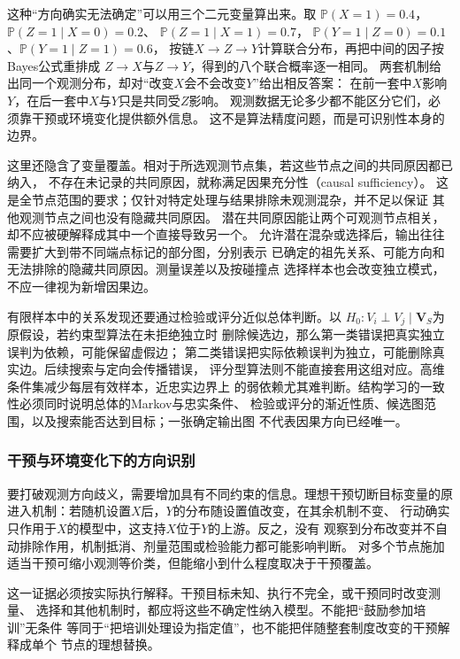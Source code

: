 这种“方向确实无法确定”可以用三个二元变量算出来。取
\(\mathbb P(X=1)=0.4\)，\(\mathbb P(Z=1\mid X=0)=0.2\)、
\(\mathbb P(Z=1\mid X=1)=0.7\)，
\(\mathbb P(Y=1\mid Z=0)=0.1\)、\(\mathbb P(Y=1\mid Z=1)=0.6\)，
按链\(X\to Z\to Y\)计算联合分布，再把中间的因子按Bayes公式重排成
\(Z\to X\)与\(Z\to Y\)，得到的八个联合概率逐一相同。
两套机制给出同一个观测分布，却对“改变\(X\)会不会改变\(Y\)”给出相反答案：
在前一套中\(X\)影响\(Y\)，在后一套中\(X\)与\(Y\)只是共同受\(Z\)影响。
观测数据无论多少都不能区分它们，必须靠干预或环境变化提供额外信息。
这不是算法精度问题，而是可识别性本身的边界。

这里还隐含了变量覆盖。相对于所选观测节点集，若这些节点之间的共同原因都已纳入，
不存在未记录的共同原因，就称满足因果充分性（causal sufficiency）。
这是全节点范围的要求；仅针对特定处理与结果排除未观测混杂，并不足以保证
其他观测节点之间也没有隐藏共同原因。
潜在共同原因能让两个可观测节点相关，却不应被硬解释成其中一个直接导致另一个。
允许潜在混杂或选择后，输出往往需要扩大到带不同端点标记的部分图，分别表示
已确定的祖先关系、可能方向和无法排除的隐藏共同原因。测量误差以及按碰撞点
选择样本也会改变独立模式，不应一律视为新增因果边。

有限样本中的关系发现还要通过检验或评分近似总体判断。以
\(H_0:V_i\perp V_j\mid\bm V_S\)为原假设，若约束型算法在未拒绝独立时
删除候选边，那么第一类错误把真实独立误判为依赖，可能保留虚假边；
第二类错误把实际依赖误判为独立，可能删除真实边。后续搜索与定向会传播错误，
评分型算法则不能直接套用这组对应。高维条件集减少每层有效样本，近忠实边界上
的弱依赖尤其难判断。结构学习的一致性必须同时说明总体的Markov与忠实条件、
检验或评分的渐近性质、候选图范围，以及搜索能否达到目标；一张确定输出图
不代表因果方向已经唯一。

\subsubsection{干预与环境变化下的方向识别}
\label{sec:causal-interventional-structure}

要打破观测方向歧义，需要增加具有不同约束的信息。理想干预切断目标变量的原
进入机制：若随机设置\(X\)后，\(Y\)的分布随设置值改变，在其余机制不变、
行动确实只作用于\(X\)的模型中，这支持\(X\)位于\(Y\)的上游。反之，没有
观察到分布改变并不自动排除作用，机制抵消、剂量范围或检验能力都可能影响判断。
对多个节点施加适当干预可缩小观测等价类，但能缩小到什么程度取决于干预覆盖。

这一证据必须按实际执行解释。干预目标未知、执行不完全，或干预同时改变测量、
选择和其他机制时，都应将这些不确定性纳入模型。不能把“鼓励参加培训”无条件
等同于“把培训处理设为指定值”，也不能把伴随整套制度改变的干预解释成单个
节点的理想替换。

